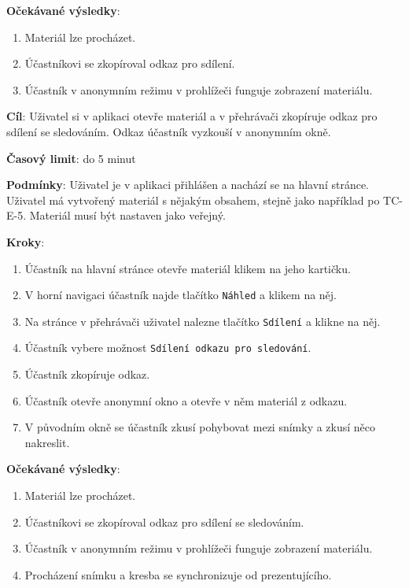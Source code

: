 \textbf{Očekávané výsledky}:

\begin{enumerate}[leftmargin=1.4cm]
    \item Materiál lze procházet.
    \item Účastníkovi se zkopíroval odkaz pro sdílení.
    \item Účastník v anonymním režimu v prohlížeči funguje zobrazení materiálu.
\end{enumerate}





\vspace{1em}

\textbf{Cíl}: Uživatel si v aplikaci otevře materiál a v přehrávači zkopíruje odkaz pro sdílení se sledováním. Odkaz účastník vyzkouší v anonymním okně.

\textbf{Časový limit}: do 5 minut

\textbf{Podmínky}:  Uživatel je v aplikaci přihlášen a nachází se na hlavní stránce.  Uživatel má vytvořený materiál s nějakým obsahem, stejně jako například po TC-E-5. Materiál musí být nastaven jako veřejný.

\textbf{Kroky}:

\begin{enumerate}[leftmargin=1.4cm]
    \item Účastník na hlavní stránce otevře materiál klikem na jeho kartičku.
    \item V horní navigaci účastník najde tlačítko \verb|Náhled| a klikem na něj.
    \item Na stránce v přehrávači uživatel nalezne tlačítko \verb|Sdílení| a klikne na něj.
    \item Účastník vybere možnost \verb|Sdílení odkazu pro sledování|.
    \item Účastník zkopíruje odkaz.
    \item Účastník otevře anonymní okno a otevře v něm materiál z odkazu.
    \item V původním okně se účastník zkusí pohybovat mezi snímky a zkusí něco nakreslit. 
\end{enumerate}

\textbf{Očekávané výsledky}:

\begin{enumerate}[leftmargin=1.4cm]
    \item Materiál lze procházet.
    \item Účastníkovi se zkopíroval odkaz pro sdílení se sledováním.
    \item Účastník v anonymním režimu v prohlížeči funguje zobrazení materiálu.
    \item Procházení snímku a kresba se synchronizuje od prezentujícího.
\end{enumerate}




